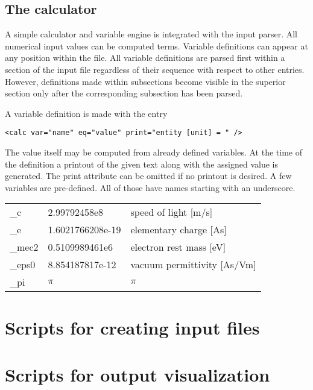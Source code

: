\documentclass[11pt]{article}
\begin{document}
\subsection{The calculator}

A simple calculator and variable engine is integrated with
the input parser. All numerical input values can be computed terms.
Variable definitions can appear at any position within the file.
All variable definitions are parsed first within a section of the input file
regardless of their sequence with respect to other entries.
However, definitions made within subsections become visible in
the superior section only after the corresponding subsection has been parsed.

A variable definition is made with the entry
\begin{lstlisting}
<calc var="name" eq="value" print="entity [unit] = " />
\end{lstlisting}
The value itself may be computed from already defined variables.
At the time of the definition a printout of the given text along with the
assigned value is generated. The print attribute can be omitted if no printout is desired.
A few variables are pre-defined. All of those have names starting with an underscore.
\\[1ex]
\begin{tabular}{lll}
\_c & 2.99792458e8 & speed of light [m/s] \\
\_e & 1.6021766208e-19 & elementary charge [As] \\
\_mec2 & 0.5109989461e6 & electron rest mass [eV] \\
\_eps0 & 8.854187817e-12 & vacuum permittivity [As/Vm] \\
\_pi & $\pi$ & $\pi$ \\
\end{tabular}

\section{Scripts for creating input files}

\section{Scripts for output visualization}
\end{document}
